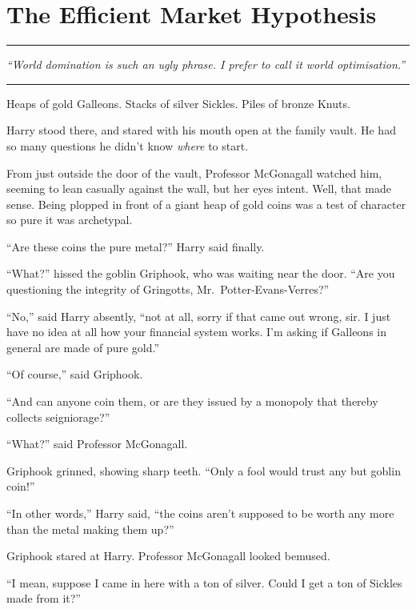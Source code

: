 \chapter{The Efficient Market
Hypothesis}\label{the-efficient-market-hypothesis}

\begin{center}\rule{3in}{0.4pt}\end{center}

\emph{``World domination is such an ugly phrase. I prefer to call it
world optimisation.''}

\begin{center}\rule{3in}{0.4pt}\end{center}

Heaps of gold Galleons. Stacks of silver Sickles. Piles of bronze Knuts.

Harry stood there, and stared with his mouth open at the family vault.
He had so many questions he didn't know \emph{where} to start.

From just outside the door of the vault, Professor McGonagall watched
him, seeming to lean casually against the wall, but her eyes intent.
Well, that made sense. Being plopped in front of a giant heap of gold
coins was a test of character so pure it was archetypal.

``Are these coins the pure metal?'' Harry said finally.

``What?'' hissed the goblin Griphook, who was waiting near the door.
``Are you questioning the integrity of Gringotts,
Mr.~Potter-Evans-Verres?''

``No,'' said Harry absently, ``not at all, sorry if that came out wrong,
sir. I just have no idea at all how your financial system works. I'm
asking if Galleons in general are made of pure gold.''

``Of course,'' said Griphook.

``And can anyone coin them, or are they issued by a monopoly that
thereby collects seigniorage?''

``What?'' said Professor McGonagall.

Griphook grinned, showing sharp teeth. ``Only a fool would trust any but
goblin coin!''

``In other words,'' Harry said, ``the coins aren't supposed to be worth
any more than the metal making them up?''

Griphook stared at Harry. Professor McGonagall looked bemused.

``I mean, suppose I came in here with a ton of silver. Could I get a ton
of Sickles made from it?''

